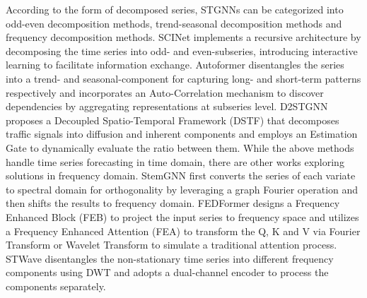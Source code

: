 \documentclass[final,12pt]{elsarticle}
\begin{document}
According to the form of decomposed series, 
STGNNs can be categorized into 
odd-even decomposition methods, 
trend-seasonal decomposition methods and frequency decomposition methods.  %
SCINet \cite{liu2022scinet} implements a recursive architecture 
by decomposing the time series into odd- and even-subseries, 
introducing interactive learning to facilitate information exchange.  %
Autoformer \cite{wu2021autoformer} disentangles the series into a trend- and seasonal-component 
for capturing long- and short-term patterns respectively 
and incorporates an Auto-Correlation mechanism 
to discover dependencies by aggregating representations at subseries level.  %
D2STGNN \cite{shao2022decoupled} proposes a Decoupled Spatio-Temporal Framework (DSTF) 
that decomposes traffic signals into diffusion and inherent components 
and employs an Estimation Gate to dynamically evaluate the ratio between them.  %
While the above methods handle time series forecasting in time domain, 
there are other works exploring solutions in frequency domain.  %
StemGNN \cite{cao2020spectral} 
first converts the series of each variate to spectral domain 
for orthogonality by leveraging a graph Fourier operation 
and then shifts the results to frequency domain.  %
FEDFormer \cite{zhou2022fedformer} designs a Frequency Enhanced Block (FEB) 
to project the input series to frequency space 
and utilizes a Frequency Enhanced Attention (FEA) 
to transform the Q, K and V via Fourier Transform or Wavelet Transform 
to simulate a traditional attention process.  %
STWave \cite{fang2023spatio} disentangles the non-stationary time series 
into different frequency components using DWT 
and adopts a dual-channel encoder to process the components separately.  %
\end{document}
